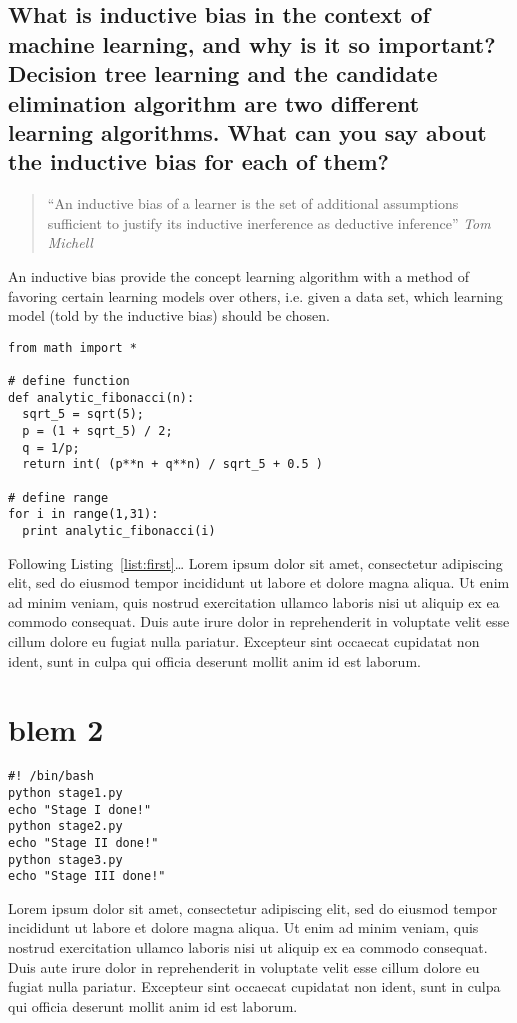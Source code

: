 \documentclass[a4paper,11pt]{article}
\theoremstyle{mytheor}
\begin{document}
\newpage
\subsection{What is inductive bias in the context of machine learning, and why is it so important? Decision tree learning and the candidate elimination algorithm are two different learning algorithms. What can you say about the inductive bias for each of them?}
\begin{quotation}
  ``An inductive bias of a learner is the set of additional assumptions sufficient to justify its inductive inerference as deductive inference''
  \em Tom Michell
\end{quotation}
An inductive bias provide the concept learning algorithm with a method of favoring certain learning models over others, i.e. given a data set, which learning model (told by the inductive bias) should be chosen.






\begin{lstlisting}[label={list:first},caption=Sample Python code -- Fibonacci sequence calculated analytically.]
from math import *

# define function 
def analytic_fibonacci(n):
  sqrt_5 = sqrt(5);
  p = (1 + sqrt_5) / 2;
  q = 1/p;
  return int( (p**n + q**n) / sqrt_5 + 0.5 )
 
# define range
for i in range(1,31):
  print analytic_fibonacci(i)
\end{lstlisting}

Following Listing~\ref{list:first}\ldots{} 
Lorem ipsum dolor sit amet, consectetur adipiscing elit, sed do eiusmod tempor incididunt ut labore et dolore magna aliqua. Ut enim ad minim veniam, quis nostrud exercitation ullamco laboris nisi ut aliquip ex ea commodo consequat. Duis aute irure dolor in reprehenderit in voluptate velit esse cillum dolore eu fugiat nulla pariatur. Excepteur sint occaecat cupidatat non ident, sunt in culpa qui officia deserunt mollit anim id est laborum.

\section*{blem 2}

\begin{lstlisting}[label={list:second},caption=Sample Bash code.]
#! /bin/bash
python stage1.py
echo "Stage I done!"
python stage2.py
echo "Stage II done!"
python stage3.py
echo "Stage III done!"
\end{lstlisting}

Lorem ipsum dolor sit amet, consectetur adipiscing elit, sed do eiusmod tempor incididunt ut labore et dolore magna aliqua. Ut enim ad minim veniam, quis nostrud exercitation ullamco laboris nisi ut aliquip ex ea commodo consequat. Duis aute irure dolor in reprehenderit in voluptate velit esse cillum dolore eu fugiat nulla pariatur. Excepteur sint occaecat cupidatat non ident, sunt in culpa qui officia deserunt mollit anim id est laborum.
\end{document}
